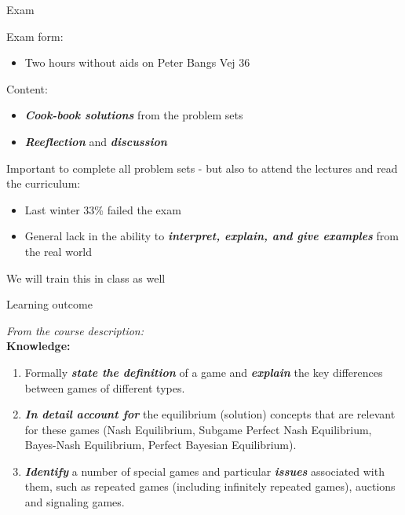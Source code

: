 \begin{frame}{Exam}
\begin{multicols}{2}\color{lightgray}
Exam form:
\begin{itemize}\color{lightgray}
  \item[\textcolor{lightgray}{\textbullet}] Two hours without aids on Peter Bangs Vej 36
\end{itemize}
Content:
\begin{itemize}\color{lightgray}
  \item[\textcolor{lightgray}{\textbullet}] \textit{\textbf{Cook-book solutions}} from the problem sets
  \item[\textcolor{lightgray}{\textbullet}] \textit{\textbf{Reeflection}} and \textit{\textbf{discussion}}
\end{itemize}
\vfill\null \columnbreak \color{black}
Important to complete all problem sets - but also to attend the lectures and read the curriculum:
\begin{itemize}
  \item Last winter 33\% failed the exam
  \item General lack in the ability to \textit{\textbf{interpret, explain, and give examples}} from the real world
\end{itemize}
We will train this in class as well
\end{multicols}
\end{frame}

\begin{frame}{Learning outcome}
\begin{multicols}{2}
  \textit{From the course description:}
  \\\medskip
  \textbf{Knowledge:}
  \begin{enumerate}
    \item Formally \textit{\textbf{state the definition}} of a game and \textit{\textbf{explain}} the key differences between games of different types.
    \item \textit{\textbf{In detail account for}} the equilibrium (solution) concepts that are relevant for these games (Nash Equilibrium, Subgame Perfect Nash Equilibrium, Bayes-Nash Equilibrium, Perfect Bayesian Equilibrium).
    \item \textit{\textbf{Identify}} a number of special games and particular \textit{\textbf{issues}} associated with them, such as repeated games (including infinitely repeated games), auctions and signaling games.
  \end{enumerate}
\vfill\null \columnbreak
\vfill\null
\end{multicols}
\end{frame}

